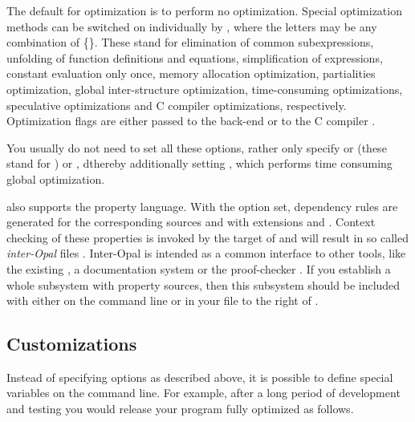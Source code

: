 The default for optimization is to perform no optimization. Special
optimization methods can be switched on individually by
, where the letters may be any combination of \{\}.  These stand for elimination of common subexpressions,
unfolding of function definitions and equations, simplification of
expressions, constant evaluation only once, memory allocation
optimization, partialities optimization, global inter-structure
optimization, time-consuming optimizations, speculative optimizations
and C compiler optimizations, respectively.  Optimization flags are
either passed to the back-end  or to the C compiler .

You usually do not need to set all these options, rather only specify
 or  (these stand for ) or , 
dthereby additionally setting , which
performs time consuming global optimization. 


 also supports the \opal{} property language.
With the  option set, dependency rules are generated for the
corresponding sources  and  with
extensions  and . Context checking of these properties
is invoked by the  target of  and will result in so
called {\em inter-Opal} files . 
Inter-Opal is intended as a common interface to other \opal{}
tools, like the existing , a documentation system 
or the proof-checker . 
If you establish a whole subsystem with property
sources, then this subsystem should be included with  either on
the  command line or in your  file to the right of
. 


\subsection{Customizations}
Instead of specifying options as described above, it is possible to
define special variables on the command line. For example, after a
long period of development and testing you would release your program
fully optimized as follows.

